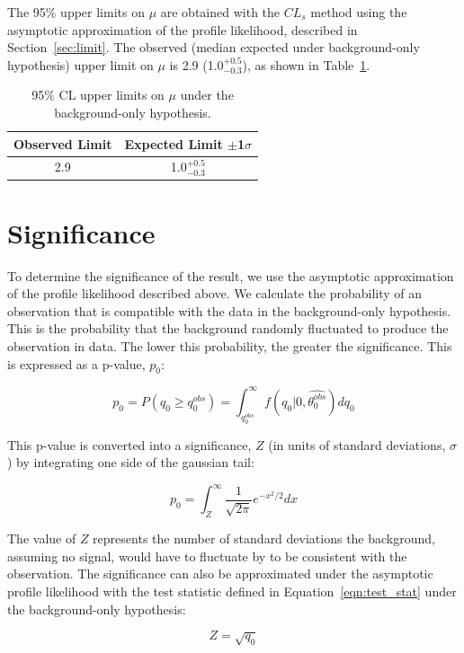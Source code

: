 The 95$\%$ upper limits on $\mu$ are obtained with the $CL_{s}$ method using the asymptotic approximation of the profile likelihood, described in Section~\ref{sec:limit}.
The observed (median expected under background-only hypothesis) upper limit on $\mu$ is 2.9 (1.0$^{+0.5}_{-0.3}$), as shown in Table~\ref{tab:limits}.

\begin{table}[htbp]
\begin{center}
  \caption[Table of Final Limits]{95$\%$ CL upper limits on $\mu$ under the background-only hypothesis.}
    \begin{tabular}{c c} \hline
      Observed Limit & Expected Limit $\pm$1$\sigma$  \\ \hline 
      2.9 & 1.0$^{+0.5}_{-0.3}$  \\
      \hline
    \end{tabular}
    \label{tab:limits}
\end{center}
\end{table}



\section{Significance}
To determine the significance of the result, we use the asymptotic approximation of the profile likelihood described above. We calculate the probability of an observation that is compatible with the
data in the background-only hypothesis. This is the probability that the background randomly fluctuated to produce the observation in data. The lower this probability, the greater the significance.
This is expressed as a p-value, $p_{0}$:

\begin{equation}
\label{eqn:signif1}
p_{0} = P(q_{0} \geq q_{0}^{obs}) = \int_{q_{0}^{obs}}^{\infty} f(q_{0}|0,\hat{\theta_{0}^{obs}}) dq_{0}
\end{equation}

\noindent This p-value is converted into a significance, $Z$ (in units of standard deviations, $\sigma$) by integrating one side of the gaussian tail:

\begin{equation}
\label{eqn:signif2}
p_{0} = \int_{Z}^{\infty} \frac{1}{\sqrt{2\pi}}e^{-x^{2}/2} dx
\end{equation}

\noindent The value of $Z$ represents the number of standard deviations the background, assuming no signal, would have to fluctuate by to be consistent with the observation. 
The significance can also be approximated under the asymptotic profile likelihood with the test statistic defined in Equation~\ref{eqn:test_stat} under the background-only hypothesis:

\begin{equation}
\label{eqn:signif3}
Z = \sqrt{q_{0}}
\end{equation}
